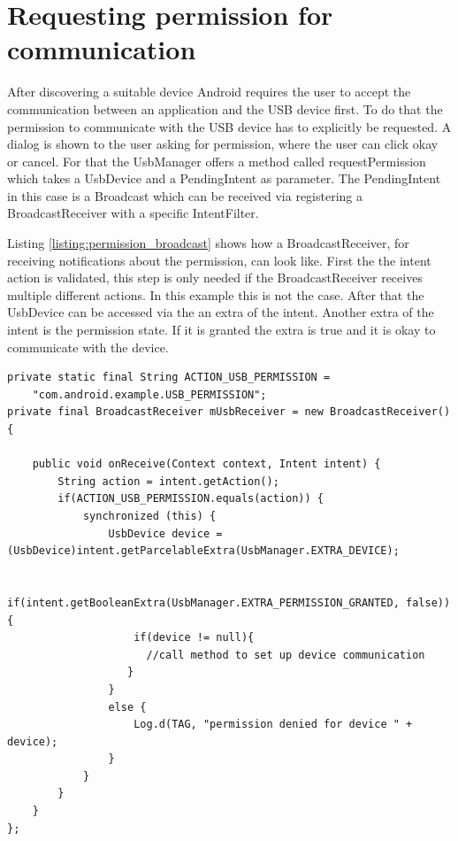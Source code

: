 \section{Requesting permission for communication}
\label{section:request_permission}

After discovering a suitable device Android requires the user to accept the communication between an application and the USB device first. To do that the permission to communicate with the USB device has to explicitly be requested. A dialog is shown to the user asking for permission, where the user can click okay or cancel. For that the UsbManager offers a method called requestPermission which takes a UsbDevice and a PendingIntent as parameter. The PendingIntent in this case is a Broadcast which can be received via registering a BroadcastReceiver with a specific IntentFilter.

Listing \ref{listing:permission_broadcast} shows how a BroadcastReceiver, for receiving notifications about the permission, can look like. First the the intent action is validated, this step is only needed if the BroadcastReceiver receives multiple different actions. In this example this is not the case. After that the UsbDevice can be accessed via the an extra of the intent. Another extra of the intent is the permission state. If it is granted the extra is true and it is okay to communicate with the device.

\begin{lstlisting}[caption=Permission BroadcastReceiver \cite{android_usb_host}, label=listing:permission_broadcast]
private static final String ACTION_USB_PERMISSION =
    "com.android.example.USB_PERMISSION";
private final BroadcastReceiver mUsbReceiver = new BroadcastReceiver() {

    public void onReceive(Context context, Intent intent) {
        String action = intent.getAction();
        if(ACTION_USB_PERMISSION.equals(action)) {
            synchronized (this) {
                UsbDevice device = (UsbDevice)intent.getParcelableExtra(UsbManager.EXTRA_DEVICE);

                if(intent.getBooleanExtra(UsbManager.EXTRA_PERMISSION_GRANTED, false)) {
                    if(device != null){
                      //call method to set up device communication
                   }
                } 
                else {
                    Log.d(TAG, "permission denied for device " + device);
                }
            }
        }
    }
};
\end{lstlisting}

